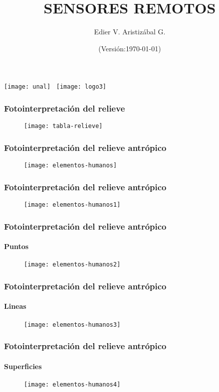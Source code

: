 \documentclass[14pt]{beamer}
\title[Fotogeomorfología]{SENSORES REMOTOS}
\author[Edier Aristizábal]{Edier V. Aristizábal G.}
\institute{\emph{evaristizabalg@unal.edu.co}}
\date{(Versión:\today)}
\begin{document}
\begin{frame}
\titlepage
\centering
	\texttt{[image: unal]}\hspace*{4.75cm}~%
   	\texttt{[image: logo3]} 
\end{frame}
  \begin{frame}
\frametitle{Fotointerpretación del relieve}
 \begin{figure}
    \centering
    \texttt{[image: tabla-relieve]}
  \end{figure}
\end{frame}
  \begin{frame}
\frametitle{Fotointerpretación del relieve antrópico}
 \begin{figure}
    \centering
    \texttt{[image: elementos-humanos]}
  \end{figure}
\end{frame}
  \begin{frame}
\frametitle{Fotointerpretación del relieve antrópico}
 \begin{figure}
    \centering
    \texttt{[image: elementos-humanos1]}
  \end{figure}
\end{frame}
  \begin{frame}
\frametitle{Fotointerpretación del relieve antrópico}
\framesubtitle{Puntos}
 \begin{figure}
    \centering
    \texttt{[image: elementos-humanos2]}
  \end{figure}
\end{frame}
  \begin{frame}
\frametitle{Fotointerpretación del relieve antrópico}
\framesubtitle{Lineas}
 \begin{figure}
    \centering
    \texttt{[image: elementos-humanos3]}
  \end{figure}
\end{frame}
  \begin{frame}
\frametitle{Fotointerpretación del relieve antrópico}
\framesubtitle{Superficies}
 \begin{figure}
    \centering
    \texttt{[image: elementos-humanos4]}
  \end{figure}
\end{frame}
\end{document}
